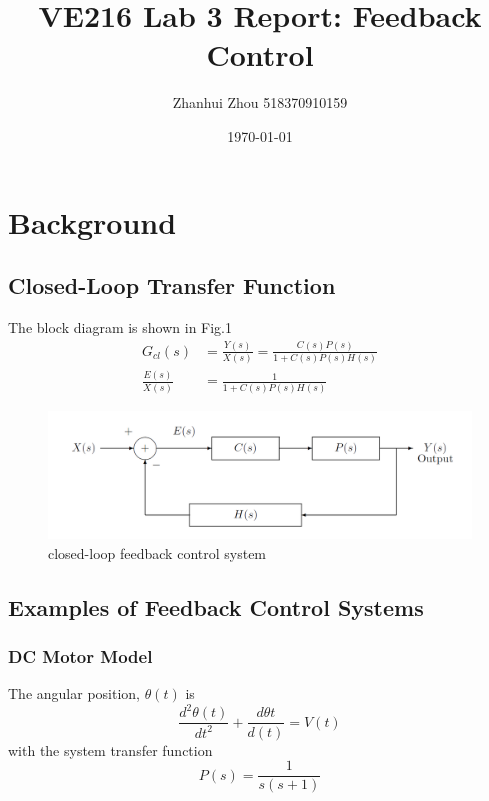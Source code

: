 \documentclass[a4paper]{article}
\title{\textbf{VE216 Lab 3 Report: Feedback Control}}
\author{
    \Large Zhanhui Zhou
    \normalsize 518370910159
}
\date{\today}
\begin{document}
    \maketitle

    \section{Background}

        \subsection{Closed-Loop Transfer Function}
        The block diagram is shown in Fig.1
        \begin{align*}
            G_{cl}(s) &= \frac{Y(s)}{X(s)} = \frac{C(s)P(s)}{1+C(s)P(s)H(s)} \\
            \frac{E(s)}{X(s)} &= \frac{1}{1+C(s)P(s)H(s)}
        \end{align*}
        \begin{figure}[H]
            \centering
            \includegraphics[width=12cm]{diagram.png}
            \caption{closed-loop feedback control system}
        \end{figure}

        \subsection{Examples of Feedback Control Systems}

            \subsubsection{DC Motor Model}
            The angular position, $\theta(t)$ is
            \begin{equation*}
                \frac{d^2\theta(t)}{dt^2} + \frac{d\theta t}{d(t)} = V(t)
            \end{equation*}
            with the system transfer function
            \begin{equation*}
                P(s) = \frac{1}{s(s+1)}
            \end{equation*}
\end{document}
